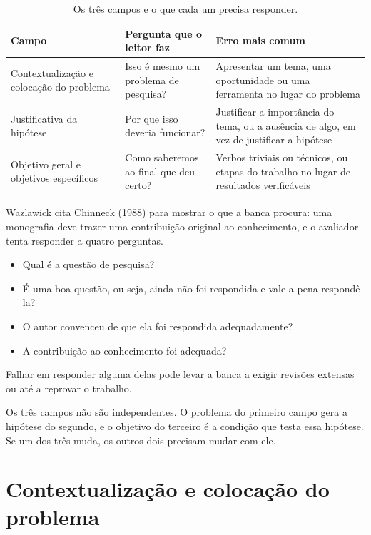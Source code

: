 \documentclass[10pt,a4paper]{extarticle}
\theoremstyle{definition}
\begin{document}
\begin{table}[h]
\centering
\small
\renewcommand{\arraystretch}{1.2}
\begin{tabularx}{\textwidth}{@{}l L L@{}}
\toprule
Campo & Pergunta que o leitor faz & Erro mais comum \\
\midrule
Contextualização e colocação do problema & Isso é mesmo um problema de pesquisa? & Apresentar um tema, uma oportunidade ou uma ferramenta no lugar do problema \\
Justificativa da hipótese & Por que isso deveria funcionar? & Justificar a importância do tema, ou a ausência de algo, em vez de justificar a hipótese \\
Objetivo geral e objetivos específicos & Como saberemos ao final que deu certo? & Verbos triviais ou técnicos, ou etapas do trabalho no lugar de resultados verificáveis \\
\bottomrule
\end{tabularx}
\caption{Os três campos e o que cada um precisa responder.}
\label{tab:campos}
\end{table}

Wazlawick cita Chinneck (1988) para mostrar o que a banca procura: uma monografia deve trazer uma contribuição original ao conhecimento, e o avaliador tenta responder a quatro perguntas.

\begin{itemize}
  \item Qual é a questão de pesquisa?
  \item É uma boa questão, ou seja, ainda não foi respondida e vale a pena respondê-la? 
  \item O autor convenceu de que ela foi respondida adequadamente?
  \item A contribuição ao conhecimento foi adequada?
\end{itemize}

Falhar em responder alguma delas pode levar a banca a exigir revisões extensas ou até a reprovar o trabalho.

Os três campos não são independentes. O problema do primeiro campo gera a hipótese do segundo, e o objetivo do terceiro é a condição que testa essa hipótese. Se um dos três muda, os outros dois precisam mudar com ele.


\pagebreak
\section{Contextualização e colocação do problema}\label{sec:contexto}
\end{document}
